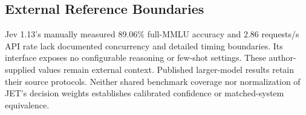 \subsection{External Reference Boundaries}
Jev 1.13's manually measured 89.06\% full-MMLU accuracy and 2.86 requests/s API
rate lack documented concurrency and detailed timing boundaries. Its interface
exposes no configurable reasoning or few-shot settings. These author-supplied
values remain external context. Published larger-model results retain their
source protocols. Neither shared benchmark coverage nor normalization of JET's
decision weights establishes calibrated confidence or matched-system equivalence.
